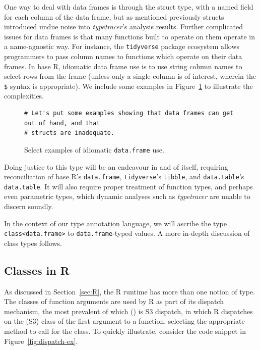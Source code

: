 \documentclass[acmsmall,review,anonymous]{acmart}\settopmatter{printfolios=true,printccs=false,printacmref=false}
\newcommand{\code}[1]{{\lstinline[style=Rin]!#1!}\xspace}
\newcommand{\typetracer}{\emph{typetracer}\xspace} %
\begin{document}
One way to deal with data frames is through the struct type, with a named field for each column of the data frame, but as mentioned previously structs introduced undue noise into \typetracer's analysis results. 
Further complicated issues for data frames is that many functions built to operate on them operate in a name-agnostic way.
For instance, the \code{tidyverse} package ecosystem allows programmers to pass column names to functions which operate on their data frames.
In base R, idiomatic data frame use is to use string column names to select rows from the frame (unless only a single column is of interest, wherein the \code{$} syntax is appropriate). 
We include some examples in Figure~\ref{fig:data-frames-bad} to illustrate the complexities.

\begin{figure}[htbp]
\begin{center}

\begin{lstlisting}
# Let's put some examples showing that data frames can get out of hand, and that
# structs are inadequate.
\end{lstlisting}

\caption{Select examples of idiomatic \code{data.frame} use.}
\label{fig:data-frames-bad}
\end{center}
\end{figure}

Doing justice to this type will be an endeavour in and of itself, requiring reconciliation of base R's \code{data.frame}, \code{tidyverse}'s \code{tibble}, and \code{data.table}'s \code{data.table}.
It will also require proper treatment of function types, and perhaps even parametric types, which dynamic analyses such as \typetracer are unable to discern soundly.

In the context of our type annotation language, we will ascribe the type \code{class<data.frame>} to \code{data.frame}-typed values.
A more in-depth discussion of class types follows.

%
%
%
%
\subsection{Classes in R}

As discussed in Section~\ref{sec:R}, the R runtime has more than one notion of type.  
The classes of function arguments are used by R as part of its dispatch mechanism, the most prevalent of which () is S3 dispatch, in which R dispatches on the (S3) class of the first argument to a function, selecting the appropriate method to call for the class.
To quickly illustrate, consider the code snippet in Figure~\ref{fig:dispatch-ex}.
\end{document}

